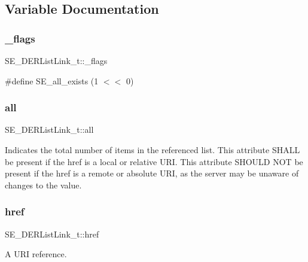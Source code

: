 \subsection{Variable Documentation}
\mbox{\label{group__DERListLink_gaee6ce628f2091dcf88d52810ed657455}} 
\subsubsection{\texorpdfstring{\+\_\+flags}{\_flags}}
{\footnotesize\ttfamily S\+E\+\_\+\+D\+E\+R\+List\+Link\+\_\+t\+::\+\_\+flags}

\#define S\+E\+\_\+all\+\_\+exists (1 $<$$<$ 0) \mbox{\label{group__DERListLink_ga174e67e5b734894a91aa477c422cc07c}} 
\subsubsection{\texorpdfstring{all}{all}}
{\footnotesize\ttfamily S\+E\+\_\+\+D\+E\+R\+List\+Link\+\_\+t\+::all}

Indicates the total number of items in the referenced list. This attribute S\+H\+A\+LL be present if the href is a local or relative U\+RI. This attribute S\+H\+O\+U\+LD N\+OT be present if the href is a remote or absolute U\+RI, as the server may be unaware of changes to the value. \mbox{\label{group__DERListLink_ga4df96d560e9da39b6341abac4a6edee6}} 
\subsubsection{\texorpdfstring{href}{href}}
{\footnotesize\ttfamily S\+E\+\_\+\+D\+E\+R\+List\+Link\+\_\+t\+::href}

A U\+RI reference. 